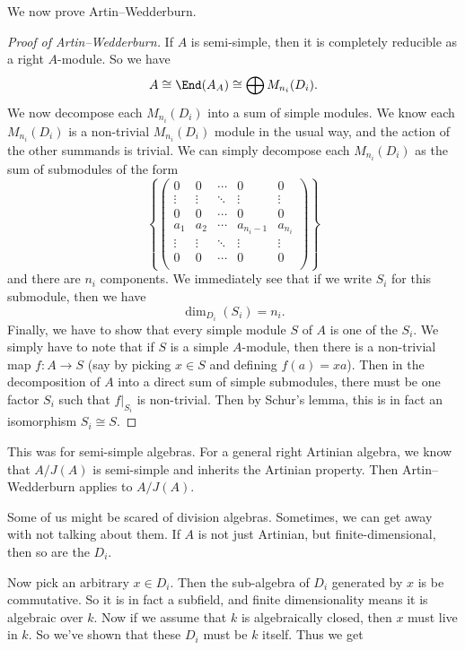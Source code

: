 \documentclass[a4paper]{article}
\begin{document}
We now prove Artin--Wedderburn.
\begin{proof}[Proof of Artin--Wedderburn]
  If $A$ is semi-simple, then it is completely reducible as a right $A$-module. So we have
  \[
    A \cong \End(A_A) \cong \bigoplus M_{n_i}(D_i).
  \]
  We now decompose each $M_{n_i}(D_i)$ into a sum of simple modules. We know each $M_{n_i}(D_i)$ is a non-trivial $M_{n_i}(D_i)$ module in the usual way, and the action of the other summands is trivial. We can simply decompose each $M_{n_i}(D_i)$ as the sum of submodules of the form
  \[
    \left\{
      \begin{pmatrix}
        0 & 0 & \cdots & 0 & 0\\
        \vdots & \vdots & \ddots & \vdots & \vdots\\
        0 & 0 & \cdots & 0 & 0\\
        a_1 & a_2 & \cdots & a_{n_i - 1} & a_{n_i}\\
        \vdots & \vdots & \ddots & \vdots & \vdots\\
        0 & 0 & \cdots & 0 & 0 \\
      \end{pmatrix}
    \right\}
  \]
  and there are $n_i$ components. We immediately see that if we write $S_i$ for this submodule, then we have
  \[
    \dim_{D_i}(S_i) = n_i.
  \]
  Finally, we have to show that every simple module $S$ of $A$ is one of the $S_i$. We simply have to note that if $S$ is a simple $A$-module, then there is a non-trivial map $f: A \to S$ (say by picking $x \in S$ and defining $f(a) = xa$). Then in the decomposition of $A$ into a direct sum of simple submodules, there must be one factor $S_i$ such that $f|_{S_i}$ is non-trivial. Then by Schur's lemma, this is in fact an isomorphism $S_i \cong S$.
\end{proof}

This was for semi-simple algebras. For a general right Artinian algebra, we know that $A/J(A)$ is semi-simple and inherits the Artinian property. Then Artin--Wedderburn applies to $A/J(A)$.

Some of us might be scared of division algebras. Sometimes, we can get away with not talking about them. If $A$ is not just Artinian, but finite-dimensional, then so are the $D_i$.

Now pick an arbitrary $x \in D_i$. Then the sub-algebra of $D_i$ generated by $x$ is be commutative. So it is in fact a subfield, and finite dimensionality means it is algebraic over $k$. Now if we assume that $k$ is algebraically closed, then $x$ must live in $k$. So we've shown that these $D_i$ must be $k$ itself. Thus we get
\end{document}
